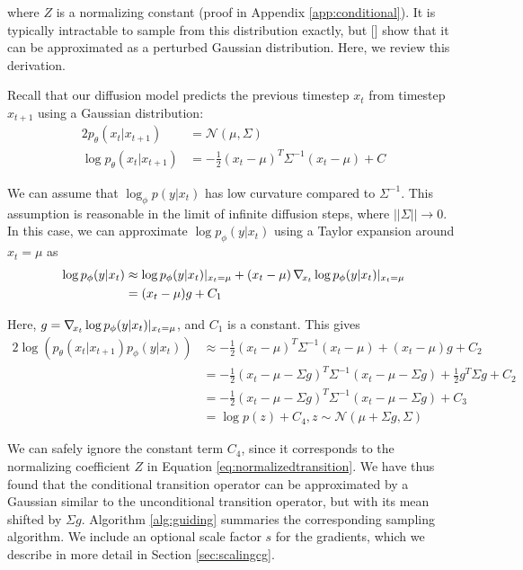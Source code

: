 \documentclass{article}
\newcommand{\namecite}[1]{\citeauthor{#1} [\citenum{#1}]}
\begin{document}
where $Z$ is a normalizing constant (proof in Appendix \ref{app:conditional}). It is typically intractable to sample from this distribution exactly, but \namecite{dickstein} show that it can be approximated as a perturbed Gaussian distribution. Here, we review this derivation.

Recall that our diffusion model predicts the previous timestep $x_t$ from timestep $x_{t+1}$ using a Gaussian distribution:
%
\begin{alignat}{2}
p_{\theta}(x_t|x_{t+1}) &= \mathcal{N}(\mu, \Sigma) \\
\log p_{\theta}(x_t|x_{t+1}) &= -\frac{1}{2} (x_t - \mu)^T \Sigma^{-1} (x_t - \mu) + C
\end{alignat}

We can assume that $\log_{\phi} p(y|x_t)$ has low curvature compared to $\Sigma^{-1}$. This assumption is reasonable in the limit of infinite diffusion steps, where $||\Sigma|| \to 0$. In this case, we can approximate $\log p_{\phi}(y|x_t)$ using a Taylor expansion around $x_t = \mu$ as 
%
\begin{alignat}{2}
\log p_{\phi}(y|x_t) &\approx \log p_{\phi}(y|x_t)|_{x_t = \mu} + (x_t - \mu)\grad_{x_t} \log p_{\phi}(y|x_t)|_{x_t = \mu} \\
&= (x_t - \mu)g + C_1 
\end{alignat}

Here, $g = \grad_{x_t} \log p_{\phi}(y|x_t)|_{x_t = \mu}$, and $C_1$ is a constant. This gives
%
\begin{alignat}{2}
    \log(p_{\theta}(x_t|x_{t+1}) p_{\phi}(y|x_t)) &\approx -\frac{1}{2} (x_t - \mu)^T \Sigma^{-1} (x_t - \mu) + (x_t - \mu)g + C_2 \\
    &= - \frac{1}{2} (x_t - \mu - \Sigma g)^T \Sigma^{-1} (x_t - \mu - \Sigma g) + \frac{1}{2} g^T \Sigma g + C_2 \\
    &= - \frac{1}{2} (x_t - \mu - \Sigma g)^T \Sigma^{-1} (x_t - \mu - \Sigma g) + C_3 \\
    &= \log p(z) + C_4, z \sim \mathcal{N}(\mu + \Sigma g, \Sigma)
    \label{eq:condsamp}
\end{alignat}

We can safely ignore the constant term $C_4$, since it corresponds to the normalizing coefficient $Z$ in Equation \ref{eq:normalizedtransition}. We have thus found that the conditional transition operator can be approximated by a Gaussian similar to the unconditional transition operator, but with its mean shifted by $\Sigma g$. Algorithm \ref{alg:guiding} summaries the corresponding sampling algorithm. We include an optional scale factor $s$ for the gradients, which we describe in more detail in Section \ref{sec:scalingcg}.  
\end{document}

